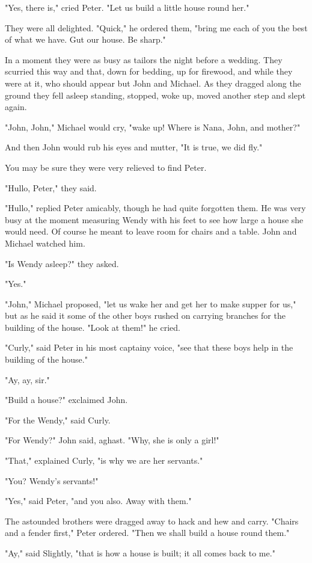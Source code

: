 "Yes, there is," cried Peter.
"Let us build a little house round her."

They were all delighted.
"Quick," he ordered them, "bring me each of you the best of what we have.
Gut our house.
Be sharp."

In a moment they were as busy as tailors the night before a wedding.
They scurried this way and that, down for bedding, up for firewood,
and while they were at it, who should appear but John and Michael.
As they dragged along the ground they fell asleep standing,
stopped, woke up, moved another step and slept again.

"John, John," Michael would cry, "wake up!
Where is Nana, John, and mother?"

And then John would rub his eyes and mutter, "It is true, we did fly."

You may be sure they were very relieved to find Peter.

"Hullo, Peter," they said.

"Hullo," replied Peter amicably, though he had quite forgotten them.
He was very busy at the moment measuring Wendy with his feet to see how large a house she would need.
Of course he meant to leave room for chairs and a table.
John and Michael watched him.

"Is Wendy asleep?\@" they asked.

"Yes."

"John," Michael proposed, "let us wake her and get her to make supper for us,"
but as he said it some of the other boys rushed on carrying branches for the building of the house.
"Look at them!\@" he cried.

"Curly," said Peter in his most captainy voice, "see that these boys help in the building of the house."

"Ay, ay, sir."

"Build a house?\@" exclaimed John.

"For the Wendy," said Curly.

"For Wendy?\@" John said, aghast.
"Why, she is only a girl!"

"That," explained Curly, "is why we are her servants."

"You?
Wendy's servants!"

"Yes," said Peter, "and you also.
Away with them."

The astounded brothers were dragged away to hack and hew and carry.
"Chairs and a fender first," Peter ordered.
"Then we shall build a house round them."

"Ay," said Slightly, "that is how a house is built;
it all comes back to me."

